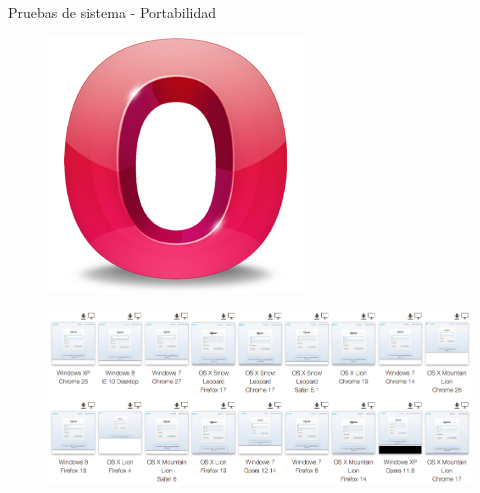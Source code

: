 \documentclass[spanish,xcolor=table,svgnames]{beamer}
\begin{document}
\begin{frame}{Pruebas de sistema - Portabilidad}
\begin{figure}[]
\includegraphics[scale=0.15]{Opera}
\end{figure}

  \begin{figure}[]
\includegraphics[scale=0.3]{browserstack}
\end{figure}

\end{frame}
\end{document}

